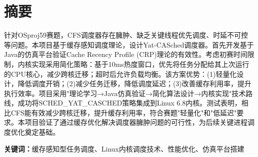 
\section*{摘要}

针对OSproj59赛题，CFS调度器存在臃肿、缺乏关键线程优先调度、时延不可控等问题。本项目基于缓存感知调度理论，设计Yat-CASched调度器。首先开发基于Java的仿真平台验证Cache Recency Profile (CRP)理论的有效性。考虑初赛时间限制，内核实现采用简化策略：基于10ms热度窗口，优先将任务分配给其上次运行的CPU核心，减少跨核迁移；超时后允许负载均衡。该方案优势：(1)轻量化设计，降低调度开销；(2)减少任务迁移，降低调度延迟；(3)改善缓存利用率，提升执行效率。项目采用"理论学习→Java仿真验证→简化算法设计→内核实现"技术路线，成功将SCHED\_YAT\_CASCHED策略集成到Linux 6.8内核。测试表明，相比CFS能有效减少跨核迁移，提升缓存利用率，符合赛题"轻量化"和"低延迟"要求。本项目验证了通过缓存优化解决调度器臃肿问题的可行性，为后续关键进程调度优化奠定基础。

\textbf{关键词：}缓存感知型任务调度、Linux内核调度技术、性能优化、仿真平台搭建